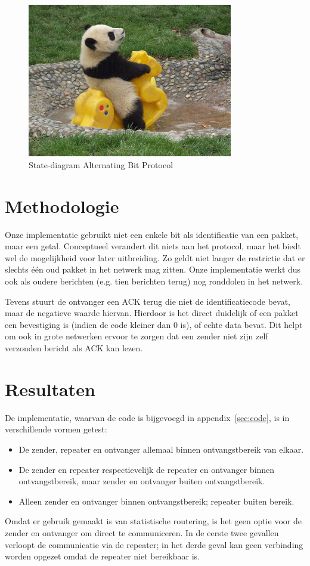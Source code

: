 \documentclass[a4paper,10pt]{article}
\begin{document}
\begin{figure}[p]
    \centering
    \includegraphics[width=0.8\textwidth]{happy-panda.jpg}
    \caption{State-diagram Alternating Bit Protocol}
    \label{fig:states}
\end{figure}

\section{Methodologie}
Onze implementatie gebruikt niet een enkele bit als identificatie van een pakket, maar een getal. Conceptueel verandert dit niets aan het protocol, maar het biedt wel de mogelijkheid voor later uitbreiding. Zo geldt niet langer de restrictie dat er slechts \'e\'en oud pakket in het netwerk mag zitten. Onze implementatie werkt dus ook als oudere berichten (e.g. tien berichten terug) nog ronddolen in het netwerk.

Tevens stuurt de ontvanger een ACK terug die niet de identificatiecode bevat, maar de negatieve waarde hiervan. Hierdoor is het direct duidelijk of een pakket een bevestiging is (indien de code kleiner dan 0 is), of echte data bevat. Dit helpt om ook in grote netwerken ervoor te zorgen dat een zender niet zijn zelf verzonden bericht als ACK kan lezen.

\section{Resultaten}
De implementatie, waarvan de code is bijgevoegd in appendix~\ref{sec:code}, is in verschillende vormen getest:
\begin{itemize}
	\item De zender, repeater en ontvanger allemaal binnen ontvangstbereik van elkaar.
	\item De zender en repeater respectievelijk de repeater en ontvanger binnen ontvangstbereik, maar zender en ontvanger buiten ontvangstbereik.
	\item Alleen zender en ontvanger binnen ontvangstbereik; repeater buiten bereik.
\end{itemize}
Omdat er gebruik gemaakt is van statistische routering, is het geen optie voor de zender en ontvanger om direct te communiceren. In de eerste twee gevallen verloopt de communicatie via de repeater; in het derde geval kan geen verbinding worden opgezet omdat de repeater niet bereikbaar is.
\end{document}
